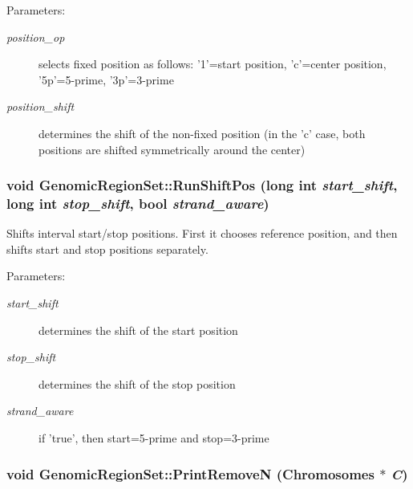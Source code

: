 \begin{Desc}
\item[Parameters:]
\begin{description}
\item[{\em position\_\-op}]selects fixed position as follows: '1'=start position, 'c'=center position, '5p'=5-prime, '3p'=3-prime \item[{\em position\_\-shift}]determines the shift of the non-fixed position (in the 'c' case, both positions are shifted symmetrically around the center) \end{description}
\end{Desc}
\hypertarget{classGenomicRegionSet_0c9ba06ad5aff586193ba765e6d13a27}{
\subsubsection[RunShiftPos]{\setlength{\rightskip}{0pt plus 5cm}void GenomicRegionSet::RunShiftPos (long int {\em start\_\-shift}, \/  long int {\em stop\_\-shift}, \/  bool {\em strand\_\-aware})}}
\label{classGenomicRegionSet_0c9ba06ad5aff586193ba765e6d13a27}


Shifts interval start/stop positions. First it chooses reference position, and then shifts start and stop positions separately. 

\begin{Desc}
\item[Parameters:]
\begin{description}
\item[{\em start\_\-shift}]determines the shift of the start position \item[{\em stop\_\-shift}]determines the shift of the stop position \item[{\em strand\_\-aware}]if 'true', then start=5-prime and stop=3-prime \end{description}
\end{Desc}
\hypertarget{classGenomicRegionSet_6dc7150acdd7a0614f8a8497da687d0e}{
\subsubsection[PrintRemoveN]{\setlength{\rightskip}{0pt plus 5cm}void GenomicRegionSet::PrintRemoveN ({\bf Chromosomes} $\ast$ {\em C})}}
\label{classGenomicRegionSet_6dc7150acdd7a0614f8a8497da687d0e}


